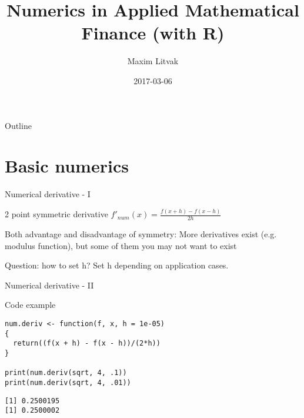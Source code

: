 \documentclass[presentation]{beamer}
\author{Maxim Litvak}
\date{2017-03-06}
\title{Numerics in Applied Mathematical Finance (with R)}
\begin{document}
\maketitle
\begin{frame}{Outline}
\tableofcontents
\end{frame}

\section{Basic numerics}
\label{sec-1}
\begin{frame}[label=sec-1-1]{Numerical derivative - I}
\begin{block}{2 point symmetric derivative}
$f'_{num}(x) = \frac{f(x + h) - f(x - h)}{2h}$
\end{block}
\begin{block}{Both advantage and disadvantage of symmetry:}
More derivatives exist (e.g. modulus function), but some of them you may not want to exist
\end{block}
\begin{block}{Question: how to set h?}
Set h depending on application cases. 
\end{block}
\end{frame}
\begin{frame}[fragile,label=sec-1-2]{Numerical derivative - II}
 \begin{block}{Code example}
\begin{verbatim}
num.deriv <- function(f, x, h = 1e-05)
{
  return((f(x + h) - f(x - h))/(2*h))
}

print(num.deriv(sqrt, 4, .1))
print(num.deriv(sqrt, 4, .01))
\end{verbatim}

\begin{verbatim}
[1] 0.2500195
[1] 0.2500002
\end{verbatim}
\end{block}
\end{frame}
\end{document}
